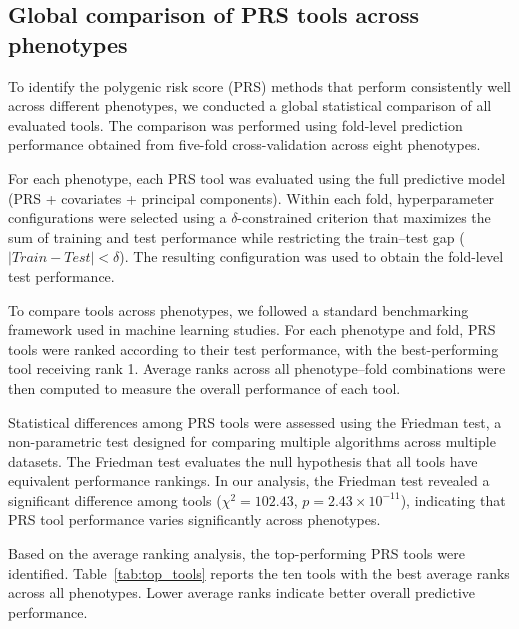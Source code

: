 \documentclass[pdflatex,sn-basic]{sn-jnl}
\begin{document}
\subsection{Global comparison of PRS tools across phenotypes}
\label{sec:global_tool_comparison}

To identify the polygenic risk score (PRS) methods that perform consistently well across different phenotypes, we conducted a global statistical comparison of all evaluated tools. The comparison was performed using fold-level prediction performance obtained from five-fold cross-validation across eight phenotypes.

For each phenotype, each PRS tool was evaluated using the full predictive model (PRS + covariates + principal components). Within each fold, hyperparameter configurations were selected using a $\delta$-constrained criterion that maximizes the sum of training and test performance while restricting the train--test gap ($|Train - Test| < \delta$). The resulting configuration was used to obtain the fold-level test performance. 

To compare tools across phenotypes, we followed a standard benchmarking framework used in machine learning studies. For each phenotype and fold, PRS tools were ranked according to their test performance, with the best-performing tool receiving rank 1. Average ranks across all phenotype–fold combinations were then computed to measure the overall performance of each tool.

Statistical differences among PRS tools were assessed using the Friedman test, a non-parametric test designed for comparing multiple algorithms across multiple datasets. The Friedman test evaluates the null hypothesis that all tools have equivalent performance rankings. In our analysis, the Friedman test revealed a significant difference among tools ($\chi^2 = 102.43$, $p = 2.43 \times 10^{-11}$), indicating that PRS tool performance varies significantly across phenotypes.

Based on the average ranking analysis, the top-performing PRS tools were identified. Table~\ref{tab:top_tools} reports the ten tools with the best average ranks across all phenotypes. Lower average ranks indicate better overall predictive performance.
\end{document}
